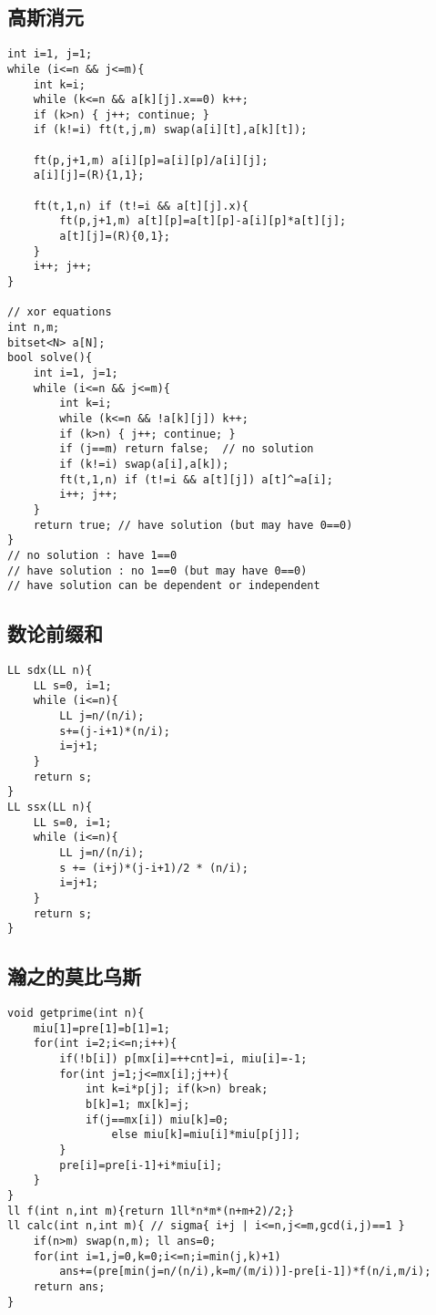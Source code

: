 \documentclass{article}
\begin{document}
\subsection{高斯消元}
\begin{lstlisting}
int i=1, j=1;
while (i<=n && j<=m){
	int k=i;
	while (k<=n && a[k][j].x==0) k++;
	if (k>n) { j++; continue; }
	if (k!=i) ft(t,j,m) swap(a[i][t],a[k][t]);
	
	ft(p,j+1,m) a[i][p]=a[i][p]/a[i][j];
	a[i][j]=(R){1,1};
	
	ft(t,1,n) if (t!=i && a[t][j].x){
		ft(p,j+1,m) a[t][p]=a[t][p]-a[i][p]*a[t][j];
		a[t][j]=(R){0,1};
	}
	i++; j++;
}

// xor equations
int n,m;
bitset<N> a[N];
bool solve(){
	int i=1, j=1;	
	while (i<=n && j<=m){
		int k=i;
		while (k<=n && !a[k][j]) k++;
		if (k>n) { j++; continue; }
		if (j==m) return false;  // no solution
		if (k!=i) swap(a[i],a[k]);
		ft(t,1,n) if (t!=i && a[t][j]) a[t]^=a[i];
		i++; j++;
	}
	return true; // have solution (but may have 0==0)
}
// no solution : have 1==0
// have solution : no 1==0 (but may have 0==0)
// have solution can be dependent or independent
\end{lstlisting}

\subsection{数论前缀和}
\begin{lstlisting}
LL sdx(LL n){
	LL s=0, i=1;
	while (i<=n){
		LL j=n/(n/i);
		s+=(j-i+1)*(n/i);
		i=j+1;
	}
	return s;
}
LL ssx(LL n){
	LL s=0, i=1;
	while (i<=n){
		LL j=n/(n/i);
		s += (i+j)*(j-i+1)/2 * (n/i);
		i=j+1;
	}
	return s;
}
\end{lstlisting}

\subsection{瀚之的莫比乌斯}
\begin{lstlisting}
void getprime(int n){
	miu[1]=pre[1]=b[1]=1;
	for(int i=2;i<=n;i++){
		if(!b[i]) p[mx[i]=++cnt]=i, miu[i]=-1;
		for(int j=1;j<=mx[i];j++){
			int k=i*p[j]; if(k>n) break;
			b[k]=1; mx[k]=j;
			if(j==mx[i]) miu[k]=0;
				else miu[k]=miu[i]*miu[p[j]];
		}
		pre[i]=pre[i-1]+i*miu[i];
	}
}
ll f(int n,int m){return 1ll*n*m*(n+m+2)/2;} 
ll calc(int n,int m){ // sigma{ i+j | i<=n,j<=m,gcd(i,j)==1 }
	if(n>m) swap(n,m); ll ans=0;
	for(int i=1,j=0,k=0;i<=n;i=min(j,k)+1)
		ans+=(pre[min(j=n/(n/i),k=m/(m/i))]-pre[i-1])*f(n/i,m/i);
	return ans;
}
\end{lstlisting}
\end{document}
